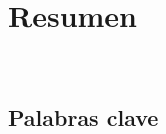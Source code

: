 \chapter*{Resumen}\label{ch:abstract-es}

\noindent \\
\section*{Palabras clave}\label{sec:keywords-es}
